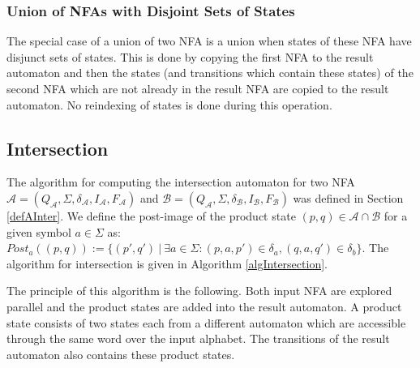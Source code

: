 \subsubsection{Union of NFAs with Disjoint Sets of States}
The special case of a union of two NFA is a union when states of these NFA have disjunct sets of states. 
This is done by copying the first NFA to the result automaton and then
the states (and transitions which contain these states) of the second NFA which are not already in the result NFA are copied to the result automaton.
No reindexing of states is done during this operation.

\subsection{Intersection}
The algorithm for computing the intersection automaton for two NFA $\mathcal{A}=(Q_\mathcal{A},\Sigma,\delta_\mathcal{A},I_\mathcal{A},F_\mathcal{A})$
and $\mathcal{B}=(Q_\mathcal{A},\Sigma,\delta_\mathcal{B},I_\mathcal{B},F_\mathcal{B})$ was defined 
in Section \ref{defAInter}. 
We define the post-image of the product state $(p,q)\in \mathcal{A}\cap\mathcal{B}$ for a given symbol $a\in \Sigma$ as: 
$Post_a((p,q)):=\{(p',q')\ |\ \exists a \in \Sigma: (p,a,p')\in \delta_a, (q,a,q')\in \delta_b\}$.
The algorithm for intersection is given in Algorithm \ref{algIntersection}.

The principle of this algorithm is the following. Both input NFA are explored parallel and the product states are added into the result automaton. 
A product state consists of two states each from a different automaton which are accessible through the same word over the input alphabet. 
The transitions of the result automaton also contains these product states.

